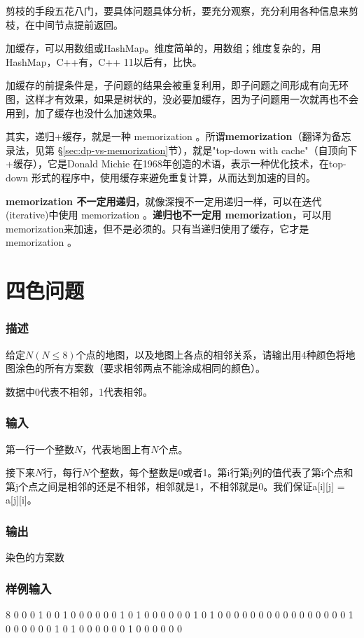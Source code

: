剪枝的手段五花八门，要具体问题具体分析，要充分观察，充分利用各种信息来剪枝，在中间节点提前返回。

加缓存，可以用数组或HashMap。维度简单的，用数组；维度复杂的，用HashMap，C++有，C++ 11以后有，比快。

加缓存的前提条件是，子问题的结果会被重复利用，即子问题之间形成有向无环图，这样才有效果，如果是树状的，没必要加缓存，因为子问题用一次就再也不会用到，加了缓存也没什么加速效果。

其实，递归+缓存，就是一种 memorization 。所谓\textbf{memorization}（翻译为备忘录法，见第 \S \ref{sec:dp-vs-memorization}节），就是"top-down with cache"（自顶向下+缓存），它是Donald Michie 在1968年创造的术语，表示一种优化技术，在top-down 形式的程序中，使用缓存来避免重复计算，从而达到加速的目的。

\textbf{memorization 不一定用递归}，就像深搜不一定用递归一样，可以在迭代(iterative)中使用 memorization 。\textbf{递归也不一定用 memorization}，可以用memorization来加速，但不是必须的。只有当递归使用了缓存，它才是 memorization 。


\section{四色问题} %

\subsubsection{描述}
给定$N(N \leq 8)$个点的地图，以及地图上各点的相邻关系，请输出用4种颜色将地图涂色的所有方案数（要求相邻两点不能涂成相同的颜色）。

数据中0代表不相邻，1代表相邻。

\subsubsection{输入}
第一行一个整数$N$，代表地图上有$N$个点。

接下来$N$行，每行$N$个整数，每个整数是0或者1。第i行第j列的值代表了第i个点和第j个点之间是相邻的还是不相邻，相邻就是1，不相邻就是0。我们保证a[i][j] = a[j][i]。

\subsubsection{输出}
染色的方案数

\subsubsection{样例输入}
\begin{Code}
8
0 0 0 1 0 0 1 0 
0 0 0 0 0 1 0 1 
0 0 0 0 0 0 1 0 
1 0 0 0 0 0 0 0 
0 0 0 0 0 0 0 0 
0 1 0 0 0 0 0 0 
1 0 1 0 0 0 0 0 
0 1 0 0 0 0 0 0
\end{Code}

